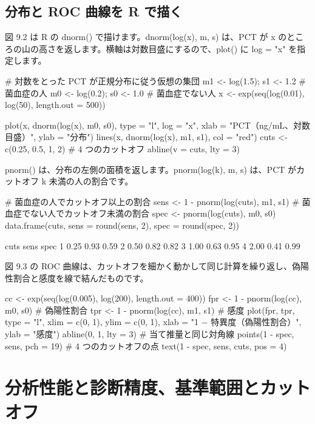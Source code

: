 \subsection{\hatten 分布と ROC 曲線を R で描く}
\label{sec:09-5-1}

図 9.2 は R の dnorm() で描けます。dnorm(log(x), m, s) は、PCT が x のところの山の高さを返します。横軸は対数目盛にするので、plot() に log = "x" を指定します。

\begin{rcode}
# 対数をとった PCT が正規分布に従う仮想の集団
m1 <- log(1.5); s1 <- 1.2    # 菌血症の人
m0 <- log(0.2); s0 <- 1.0    # 菌血症でない人
x  <- exp(seq(log(0.01), log(50), length.out = 500))

plot(x, dnorm(log(x), m0, s0), type = "l", log = "x",
     xlab = "PCT（ng/mL、対数目盛）", ylab = "分布")
lines(x, dnorm(log(x), m1, s1), col = "red")
cuts <- c(0.25, 0.5, 1, 2)   # 4 つのカットオフ
abline(v = cuts, lty = 3)
\end{rcode}

pnorm() は、分布の左側の面積を返します。pnorm(log(k), m, s) は、PCT がカットオフ k 未満の人の割合です。

\begin{rcode}
# 菌血症の人でカットオフ以上の割合
sens <- 1 - pnorm(log(cuts), m1, s1)
# 菌血症でない人でカットオフ未満の割合
spec <- pnorm(log(cuts), m0, s0)
data.frame(cuts, sens = round(sens, 2), spec = round(spec, 2))
\end{rcode}

\begin{rout}
  cuts sens spec
1 0.25 0.93 0.59
2 0.50 0.82 0.82
3 1.00 0.63 0.95
4 2.00 0.41 0.99
\end{rout}

図 9.3 の ROC 曲線は、カットオフを細かく動かして同じ計算を繰り返し、偽陽性割合と感度を線で結んだものです。

\begin{rcode}
cc  <- exp(seq(log(0.005), log(200), length.out = 400))
fpr <- 1 - pnorm(log(cc), m0, s0)   # 偽陽性割合
tpr <- 1 - pnorm(log(cc), m1, s1)   # 感度
plot(fpr, tpr, type = "l", xlim = c(0, 1), ylim = c(0, 1),
     xlab = "1 − 特異度（偽陽性割合）", ylab = "感度")
abline(0, 1, lty = 3)               # 当て推量と同じ対角線
points(1 - spec, sens, pch = 19)    # 4 つのカットオフの点
text(1 - spec, sens, cuts, pos = 4)
\end{rcode}

\section{分析性能と診断精度、基準範囲とカットオフ}
\label{sec:09-6}

